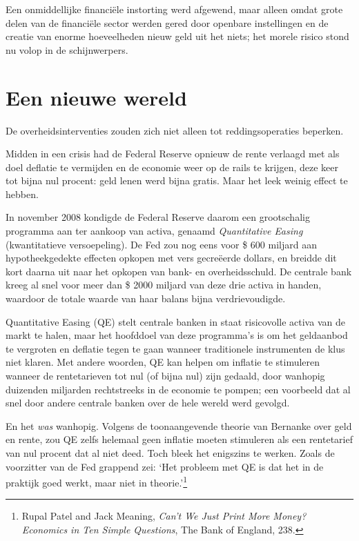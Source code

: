 \documentclass[
  a5paper,
  smalldemyvopaper,11pt,twoside,onecolumn,openright,extrafontsizes,
hidelinks]{memoir}
\begin{document}
Een onmiddellijke financiële instorting werd afgewend, maar alleen omdat
grote delen van de financiële sector werden gered door openbare
instellingen en de creatie van enorme hoeveelheden nieuw geld uit het
niets; het morele risico stond nu volop in de schijnwerpers.

\section{Een nieuwe wereld}\label{een-nieuwe-wereld}

De overheidsinterventies zouden zich niet alleen tot reddingsoperaties
beperken.

Midden in een crisis had de Federal Reserve opnieuw de rente verlaagd
met als doel deflatie te vermijden en de economie weer op de rails te
krijgen, deze keer tot bijna nul procent: geld lenen werd bijna gratis.
Maar het leek weinig effect te hebben.

In november 2008 kondigde de Federal Reserve daarom een grootschalig
programma aan ter aankoop van activa, genaamd \emph{Quantitative Easing}
(kwantitatieve versoepeling). De Fed zou nog eens voor \$ 600 miljard
aan hypotheekgedekte effecten opkopen met vers gecreëerde dollars, en
breidde dit kort daarna uit naar het opkopen van bank- en
overheidsschuld. De centrale bank kreeg al snel voor meer dan \$ 2000
miljard van deze drie activa in handen, waardoor de totale waarde van
haar balans bijna verdrievoudigde.

Quantitative Easing (QE) stelt centrale banken in staat risicovolle
activa van de markt te halen, maar het hoofddoel van deze programma's is
om het geldaanbod te vergroten en deflatie tegen te gaan wanneer
traditionele instrumenten de klus niet klaren. Met andere woorden, QE
kan helpen om inflatie te stimuleren wanneer de rentetarieven tot nul
(of bijna nul) zijn gedaald, door wanhopig duizenden miljarden
rechtstreeks in de economie te pompen; een voorbeeld dat al snel door
andere centrale banken over de hele wereld werd gevolgd.

En het \emph{was} wanhopig. Volgens de toonaangevende theorie van
Bernanke over geld en rente, zou QE zelfs helemaal geen inflatie moeten
stimuleren als een rentetarief van nul procent dat al niet deed. Toch
bleek het enigszins te werken. Zoals de voorzitter van de Fed grappend
zei: `Het probleem met QE is dat het in de praktijk goed werkt, maar
niet in theorie.'\footnote{Rupal Patel and Jack Meaning, \emph{Can't We
  Just Print More Money? Economics in Ten Simple Questions}, The Bank of
  England, 238.}
\end{document}
